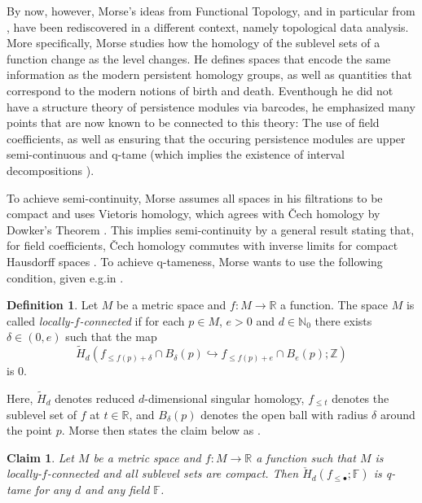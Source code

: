 \documentclass{amsart}
\theoremstyle{plain}
\newtheorem{claim}[thm]{Claim}
\theoremstyle{definition}
\newtheorem{defi}[thm]{Definition}
\newcommand\CH{\check{H}}
\begin{document}
By now, however, Morse's ideas from Functional Topology, and in particular from \cite{Morse.1940}, have been rediscovered in a different context, namely topological data analysis. More specifically, Morse studies how the homology of the sublevel sets of a function change as the level changes. He defines spaces that encode the same information as the modern persistent homology groups, as well as quantities that correspond to the modern notions of birth and death. Eventhough he did not have a structure theory of persistence modules via barcodes, he emphasized many points that are now known to be connected to this theory: The use of field coefficients, as well as ensuring that the occuring persistence modules are upper semi-continuous and q-tame (which implies the existence of interval decompositions \cite{schmahl2020structure}).

To achieve semi-continuity, Morse assumes all spaces in his filtrations to be compact and uses Vietoris homology, which agrees with \v{C}ech homology by Dowker's Theorem \cite{Dowker.1952}. This implies semi-continuity by a general result stating that, for field coefficients, \v{C}ech homology commutes with inverse limits for compact Hausdorff spaces \cite[Theorem VIII.3.6 and Theorem X.3.1]{MR0050886}. To achieve q-tameness, Morse wants to use the following condition, given e.g.\@ in \cite{Morse.1940}.

\begin{defi}
Let $M$ be a metric space and $f\colon M\to\mathbb{R}$ a function. The space $M$ is called \emph{locally-$f$-connected} if for each $p\in M$, $e>0$ and $d\in\mathbb{N}_0$ there exists $\delta\in(0,e)$ such that the map 
\[
\tilde{H}_d(f_{\leq f(p)+\delta}\cap B_{\delta}(p)\hookrightarrow f_{\leq f(p)+e}\cap B_e(p);\mathbb{Z})
\]
is 0.
\end{defi}

Here, $\tilde{H}_{d}$ denotes reduced $d$-dimensional singular homology, $f_{\leq t}$ denotes the sublevel set of $f$ at $t\in\mathbb{R}$, and $B_{\delta}(p)$ denotes the open ball with radius $\delta$ around the point $p$. Morse then states the claim below as \cite[Theorem 6.3]{Morse.1940}.

\begin{claim}
Let $M$ be a metric space and $f\colon M\to\mathbb{R}$ a function such that $M$ is locally-$f$-connected and all sublevel sets are compact. Then $\CH_d(f_{\leq\bullet};\mathbb{F})$ is q-tame for any $d$ and any field $\mathbb{F}$.
\end{claim}
\end{document}
